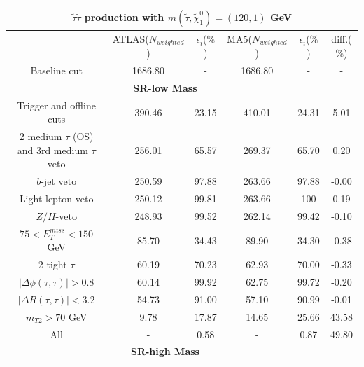 \documentclass{ws-mpla}
\begin{document}
\begin{table}[h!]
  {\begin{tabular}{@{}c c c c c c@{}} \toprule
\hline
\multicolumn{6}{c}{ \textbf{$ \tilde{\tau}\tilde{\tau} $ production with $ m(\tilde{\tau},\tilde{\chi}^0_1) = (120,1) $ GeV} }\\
\hline\hline
 & ATLAS($N_{weighted}$) & $\epsilon_i$($\%$) & MA5($N_{weighted}$) & $\epsilon_i$($\%$) & diff.($\%$) \\
\hline\hline

Baseline cut                                    &  1686.80 &     - &  1686.80 &     - &      - \\ \hline
%
\multicolumn{5}{c}{ \textbf{SR-low Mass} }\\\hline
Trigger and offline cuts                        &   390.46 & 23.15 &   410.01 & 24.31 &   5.01 \\ \hline
2 medium $\tau$ (OS) and 3rd medium $\tau$ veto &   256.01 & 65.57 &   269.37 & 65.70 &   0.20 \\ \hline
$b$-jet veto                                    &   250.59 & 97.88 &   263.66 & 97.88 &  -0.00 \\ \hline
Light lepton veto                               &   250.12 & 99.81 &   263.66 &   100 &   0.19 \\ \hline
$Z/H$-veto                                      &   248.93 & 99.52 &   262.14 & 99.42 &  -0.10 \\ \hline
$ 75 < E^{miss}_T < 150 $ GeV                   &    85.70 & 34.43 &    89.90 & 34.30 &  -0.38 \\ \hline
2 tight $\tau$                                  &    60.19 & 70.23 &    62.93 & 70.00 &  -0.33 \\ \hline
$ |\Delta\phi(\tau,\tau)| > 0.8 $               &    60.14 & 99.92 &    62.75 & 99.72 &  -0.20 \\ \hline
$ |\Delta R(\tau,\tau)| < 3.2 $                 &    54.73 & 91.00 &    57.10 & 90.99 &  -0.01 \\ \hline
$ m_{T2} > 70 $ GeV                             &     9.78 & 17.87 &    14.65 & 25.66 &  43.58 \\ \hline
All                                             &        - &  0.58 &        - &  0.87 &  49.80 \\ \hline
%
\multicolumn{5}{c}{ \textbf{SR-high Mass} }\\\hline

\end{tabular}}
\end{table}
\end{document}
